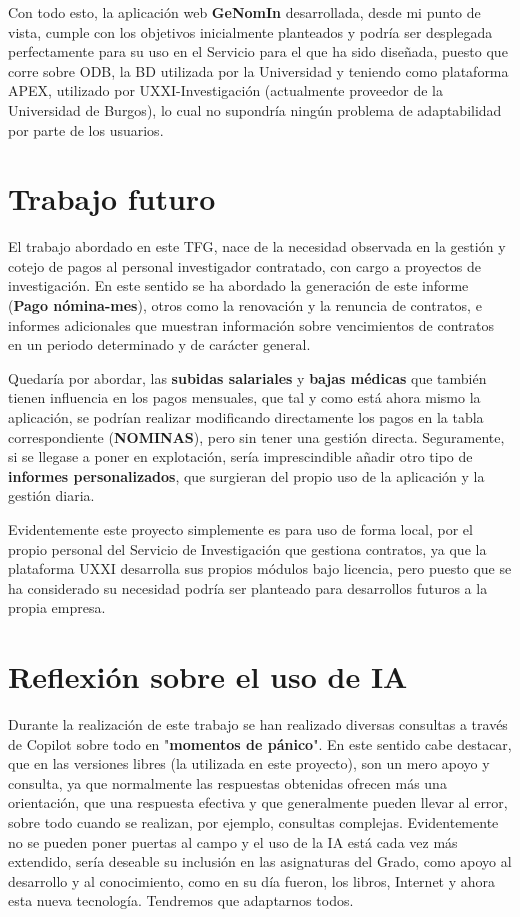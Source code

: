 Con todo esto, la aplicación web \textbf{GeNomIn} desarrollada, desde mi punto de vista, cumple con los objetivos inicialmente planteados y podría ser desplegada perfectamente para su uso en el Servicio para el que ha sido diseñada, puesto que corre sobre \acrfull{ODB}, la BD utilizada por la Universidad y teniendo como plataforma \acrshort{APEX}, utilizado por \acrshort{UXXI}-Investigación (actualmente proveedor de la Universidad de Burgos), lo cual no supondría ningún problema de adaptabilidad por parte de los usuarios.

\section{Trabajo futuro}
El trabajo abordado en este \acrshort{TFG}, nace de la necesidad observada en la gestión y cotejo de pagos al personal investigador contratado, con cargo a proyectos de investigación.
En este sentido se ha abordado la generación de este informe (\textbf{Pago nómina-mes}), otros como la renovación y la renuncia de contratos, e informes adicionales que muestran información sobre vencimientos de contratos en un periodo determinado y de carácter general.

Quedaría por abordar, las \textbf{subidas salariales} y \textbf{bajas médicas} que también tienen influencia en los pagos mensuales, que tal y como está ahora mismo la aplicación, se podrían realizar modificando directamente los pagos en la tabla correspondiente (\textbf{NOMINAS}), pero sin tener una gestión directa.
Seguramente, si se llegase a poner en explotación, sería imprescindible añadir otro tipo de \textbf{informes personalizados}, que surgieran del propio uso de la aplicación y la gestión diaria.

Evidentemente este proyecto simplemente es para uso de forma local, por el  propio personal del Servicio de Investigación que gestiona contratos, ya que la plataforma \acrshort{UXXI} desarrolla sus propios módulos bajo licencia, pero puesto que se ha considerado su necesidad podría ser planteado para desarrollos futuros a la propia empresa.

\section{Reflexión sobre el uso de \acrshort{IA}}
Durante la realización de este trabajo se han realizado diversas consultas a través de \gls{Copilot} sobre todo en "\textbf{momentos de pánico}". En este sentido cabe destacar, que en las versiones libres (la utilizada en este proyecto), son un mero apoyo y consulta, ya que normalmente las respuestas obtenidas ofrecen más una orientación, que una respuesta efectiva y que generalmente pueden llevar al error, sobre todo cuando se realizan, por ejemplo, consultas complejas.
Evidentemente no se pueden poner puertas al campo y el uso de la \acrshort{IA} está cada vez más extendido, sería deseable su inclusión en las asignaturas del Grado, como apoyo al desarrollo y al conocimiento, como en su día fueron, los libros, Internet y ahora esta nueva tecnología. Tendremos que adaptarnos todos.


